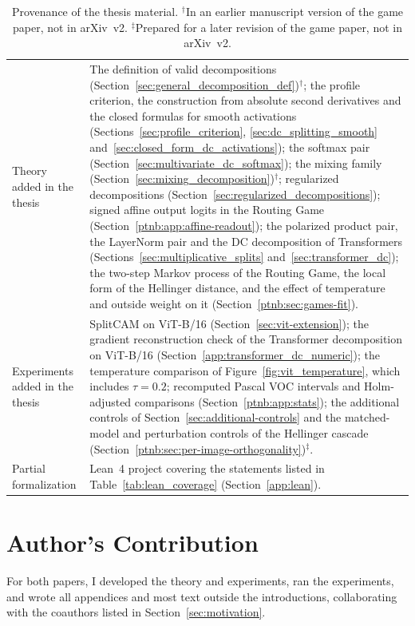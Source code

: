 \begin{table}[htbp]
\begin{tabularx}{\linewidth}{@{}>{\raggedright\arraybackslash}p{3.2cm}>{\raggedright\arraybackslash}X@{}}
Theory added in the thesis & The definition of valid decompositions (Section~\ref{sec:general_decomposition_def})$^{\dagger}$; the profile criterion, the construction from absolute second derivatives and the closed formulas for smooth activations (Sections~\ref{sec:profile_criterion}, \ref{sec:dc_splitting_smooth} and~\ref{sec:closed_form_dc_activations}); the softmax pair (Section~\ref{sec:multivariate_dc_softmax}); the mixing family (Section~\ref{sec:mixing_decomposition})$^{\dagger}$; regularized decompositions (Section~\ref{sec:regularized_decompositions}); signed affine output logits in the Routing Game (Section~\ref{ptnb:app:affine-readout}); the polarized product pair, the LayerNorm pair and the DC decomposition of Transformers (Sections~\ref{sec:multiplicative_splits} and~\ref{sec:transformer_dc}); the two-step Markov process of the Routing Game, the local form of the Hellinger distance, and the effect of temperature and outside weight on it (Section~\ref{ptnb:sec:games-fit}). \\
\addlinespace
Experiments added in the thesis & SplitCAM on ViT-B/16 (Section~\ref{sec:vit-extension}); the gradient reconstruction check of the Transformer decomposition on ViT-B/16 (Section~\ref{app:transformer_dc_numeric}); the temperature comparison of Figure~\ref{fig:vit_temperature}, which includes $\tau=0.2$; recomputed Pascal VOC intervals and Holm-adjusted comparisons (Section~\ref{ptnb:app:stats}); the additional controls of Section~\ref{sec:additional-controls} and the matched-model and perturbation controls of the Hellinger cascade (Section~\ref{ptnb:sec:per-image-orthogonality})$^{\ddagger}$. \\
\addlinespace
Partial formalization & Lean~4 project covering the statements listed in Table~\ref{tab:lean_coverage} (Section~\ref{app:lean}). \\
\bottomrule
\end{tabularx}
\caption[Provenance of the thesis material]{Provenance of the thesis material. $^{\dagger}$In an earlier manuscript version of the game paper, not in arXiv~v2. $^{\ddagger}$Prepared for a later revision of the game paper, not in arXiv~v2.}
\label{tab:provenance}
\end{table}

\section{Author's Contribution}\label{app:author_contribution}

For both papers, I developed the theory and experiments, ran the experiments, and wrote all appendices and most text outside the introductions, collaborating with the coauthors listed in Section~\ref{sec:motivation}.

